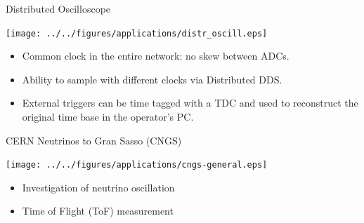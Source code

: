 \documentclass[compress,red]{beamer}
\begin{document}
\begin{frame}{Distributed Oscilloscope}
  \begin{center}
    \texttt{[image: ../../figures/applications/distr\_oscill.eps]}
    \end{center}
    \begin{block}{}
      \begin{itemize}
      \item Common clock in the entire network: no skew between ADCs.
      \item Ability to sample with different clocks via Distributed DDS.
      \item External triggers can be time tagged with a TDC and used to reconstruct the original time base in the operator's PC.
      \end{itemize}
    \end{block}
\end{frame}
\begin{frame}{CERN Neutrinos to Gran Sasso (CNGS)}

    \begin{center}
      \texttt{[image: ../../figures/applications/cngs-general.eps]}
    \end{center}

    \begin{center}
      \begin{itemize}
	\item Investigation of neutrino oscillation
	\item Time of Flight (ToF) measurement
      \end{itemize}

    \end{center}

\end{frame}
\end{document}
